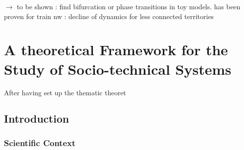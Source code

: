 $\rightarrow$ to be shown : find bifurcation or phase transitions in toy models. has been proven for train nw : decline of dynamics for less connected territories




\newpage

\section{A theoretical Framework for the Study of Socio-technical Systems}

After having set up the thematic theoret


\subsection*{Introduction}

\subsubsection*{Scientific Context}



